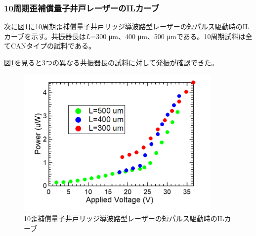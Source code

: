 {{\newpage
\subsubsection{10周期歪補償量子井戸レーザーのILカーブ}
次に図\ref{fig:fig_3_2_10QW_ridge_GS_power}に10周期歪補償量子井戸リッジ導波路型レーザーの短パルス駆動時のILカーブを示す。共振器長は$L$=300 \si{\micro\metre}、400 \si{\micro\metre}、500 \si{\micro\metre}である。10周期試料は全てCANタイプの試料である。

図\ref{fig:fig_3_2_10QW_ridge_GS_power}を見ると3つの異なる共振器長の試料に対して発振が確認できた。
\begin{figure}[h]
	\centering
	\includegraphics[width=10cm]{figure/fig_3_2_10QW_ridge_GS_power.png}
		\caption{10歪補償量子井戸リッジ導波路型レーザーの短パルス駆動時のILカーブ}
		\label{fig:fig_3_2_10QW_ridge_GS_power}
\end{figure}
\clearpage
}}

